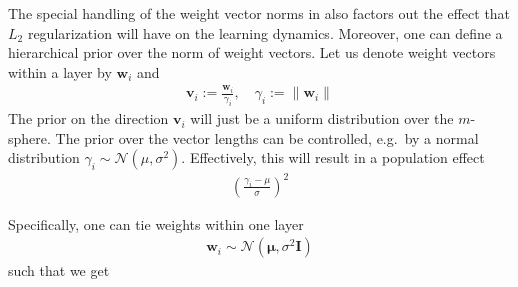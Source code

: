 \documentclass{article}
\newcommand{\w}{{\mathbf w}}
\renewcommand{\v}{{\mathbf v}}
\begin{document}
\newpage

The special handling of the weight vector norms in  \cite{salimans2016weight} also factors out the effect that $L_2$ regularization will have on the learning dynamics. Moreover, one can define a hierarchical prior over the norm of weight vectors. Let us denote weight vectors within a layer by $\w_i$ and 
\begin{align}
\v_i := \frac{ \w_i}{\gamma_i}, \quad \gamma_i := \| \w_i \|
\end{align}
The prior on the direction $\v_i$ will just be a uniform distribution over the $m$-sphere. The prior over the vector lengths can be controlled, e.g.~by a normal distribution $\gamma_i \sim \mathcal N(\mu, \sigma^2)$.  Effectively, this will result in a population effect 
\begin{align}
\left(\frac{\gamma_i - \mu}{\sigma} \right)^2
\end{align}

\newpage


Specifically, one can tie weights within one layer 
\begin{align}
\w_i  \sim \mathcal N(\mathbf \mu, \sigma^2 \mathbf I)
\end{align}
such that we get 









\end{document}
